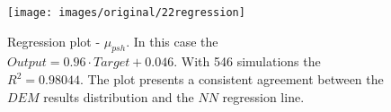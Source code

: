 \begin{figure}[!h] 
\centering 
\texttt{[image: images/original/22regression]}
\caption[Regression plot]{Regression plot - $\mu_{psh}$. In this case the
$Output = 0.96 \cdot Target + 0.046$. With 546 simulations the $R^2 = 0.98044$. The plot
presents a consistent agreement between the $DEM$ results distribution and the $NN$ regression line.}
\label{fig:22regression} 
\end{figure}


